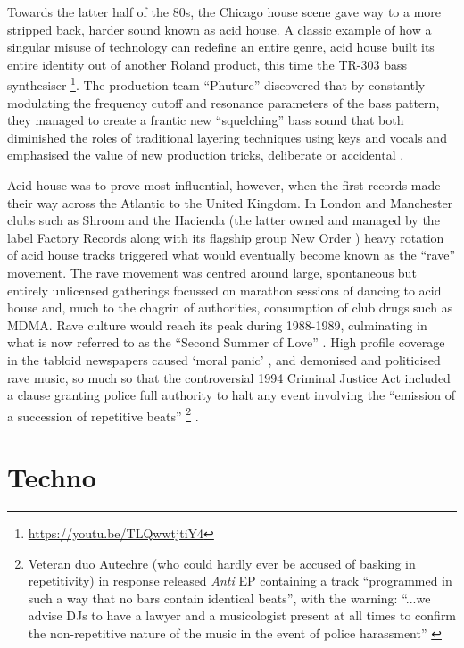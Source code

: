 Towards the latter half of the 80s, the Chicago house scene gave way to a more stripped back, harder sound known as acid house. A classic example of how a singular misuse of technology can redefine an entire genre, acid house built its entire identity out of another Roland product, this time the TR-303 bass synthesiser \citep{McLeod2001}\footnote{\url{https://youtu.be/TLQwwtjtiY4}}. The production team “Phuture” discovered that by constantly modulating the frequency cutoff and resonance parameters of the bass pattern, they managed to create a frantic new “squelching” bass sound that both diminished the roles of traditional layering techniques using keys and vocals and emphasised the value of new production tricks, deliberate or accidental \citep{Vitos2014}. 

Acid house was to prove most influential, however, when the first records made their way across the Atlantic to the United Kingdom. In London and Manchester clubs such as Shroom and the Hacienda (the latter owned and managed by the label Factory Records along with its flagship group New Order \citep{hook2009hacienda}) heavy rotation of acid house tracks triggered what would eventually become known as the “rave” movement. The rave movement was centred around large, spontaneous but entirely unlicensed gatherings focussed on marathon sessions of dancing to acid house and, much to the chagrin of authorities, consumption of club drugs such as MDMA. Rave culture would reach its peak during 1988-1989, culminating in what is now referred to as the “Second Summer of Love” \citep{Gore1997}. High profile coverage in the tabloid newspapers caused `moral panic' \citep{Martin1999}, and demonised and politicised rave music, so much so that the controversial 1994 Criminal Justice Act included a clause granting police full authority to halt any event involving the “emission of a succession of repetitive beats” \citep{gilbert1997soundtrack} \footnote{Veteran duo Autechre (who could hardly ever be accused of basking in repetitivity) in response released \textit{Anti} EP containing a track ``programmed in such a way that no bars contain identical beats'', with the warning: ``...we advise DJs to have a lawyer and a musicologist present at all times to confirm the non-repetitive nature of the music in the event of police harassment'' \citep{Atkinson2007}} .

\section{Techno}


